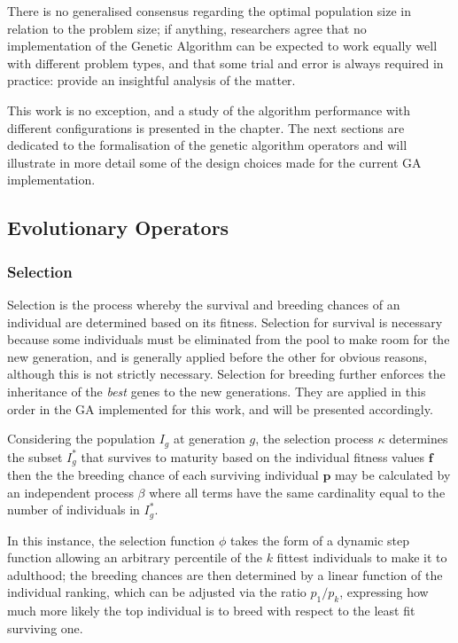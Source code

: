 There is no generalised consensus regarding the optimal population size in relation to the problem size; if anything, researchers agree that no implementation of the Genetic Algorithm can be expected to work equally well with different problem types, and that some trial and error is always required in practice: \citep{eberhart1998comparison} provide an insightful analysis of the matter.

This work is no exception, and a study of the algorithm performance with different configurations is presented in the  chapter. The next sections are dedicated to the formalisation of the genetic algorithm operators and will illustrate in more detail some of the design choices made for the current GA implementation.

\subsection{Evolutionary Operators}
\subsubsection{Selection}
Selection is the process whereby the survival and breeding chances of an individual are determined based on its fitness. Selection for survival is necessary because some individuals must be eliminated from the pool to make room for the new generation, and is generally applied before the other for obvious reasons, although this is not strictly necessary. Selection for breeding further enforces the inheritance of the \emph{best} genes to the new generations. They are applied in this order in the GA implemented for this work, and will be presented accordingly.

Considering the population $I_g$ at generation $g$, the selection process $\kappa$ determines the subset $I_g^*$ that survives to maturity based on the individual fitness values $\mathbf{f}$
then the the breeding chance of each surviving individual $\mathbf{p}$ may be calculated by an independent process $\beta$
where all terms have the same cardinality equal to the number of individuals in $I_g^*$.

In this instance, the selection function $\phi$ takes the form of a dynamic step function allowing an arbitrary percentile of the $k$ fittest individuals to make it to adulthood; the breeding chances are then determined by a linear function of the individual ranking, which can be adjusted via the ratio $p_1 / p_k$, expressing how much more likely the top individual is to breed with respect to the least fit surviving one.

